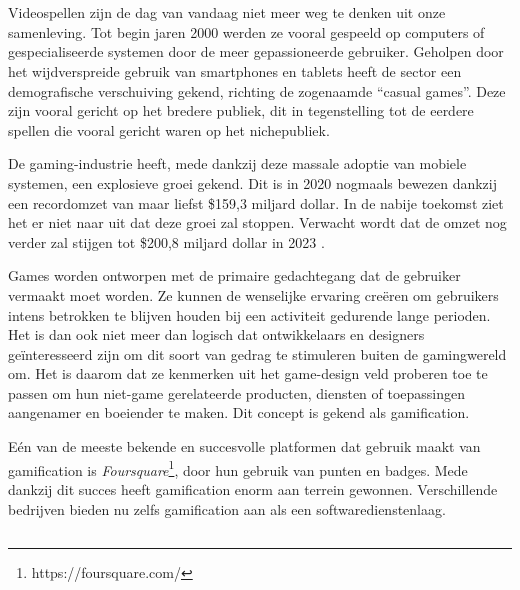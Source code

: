 
\chapter{}
\label{ch:inleiding}

Videospellen zijn de dag van vandaag niet meer weg te denken uit onze samenleving. Tot begin jaren 2000 werden ze vooral gespeeld op computers of gespecialiseerde systemen door de meer gepassioneerde gebruiker. Geholpen door het wijdverspreide gebruik van smartphones en tablets heeft de sector een demografische verschuiving gekend, richting de zogenaamde ``casual games''. Deze zijn vooral gericht op het bredere publiek, dit in tegenstelling tot de eerdere spellen die vooral gericht waren op het nichepubliek.

De gaming-industrie heeft, mede dankzij deze massale adoptie van mobiele systemen, een explosieve groei gekend. Dit is in 2020 nogmaals bewezen dankzij een recordomzet van maar liefst \$159,3 miljard dollar. In de nabije toekomst ziet het er niet naar uit dat deze groei zal stoppen. Verwacht wordt dat de omzet nog verder zal stijgen tot \$200,8 miljard dollar in 2023 \autocite{WePC2021}.

Games worden ontworpen met de primaire gedachtegang dat de gebruiker vermaakt moet worden. Ze kunnen de wenselijke ervaring creëren om gebruikers intens betrokken te blijven houden bij een activiteit gedurende lange perioden. Het is dan ook niet meer dan logisch dat ontwikkelaars en designers geïnteresseerd zijn om dit soort van gedrag te stimuleren buiten de gamingwereld om. Het is daarom dat ze kenmerken uit het game-design veld proberen toe te passen om hun niet-game gerelateerde producten, diensten of toepassingen aangenamer en boeiender te maken. Dit concept is gekend als gamification.

Eén van de meeste bekende en succesvolle platformen dat gebruik maakt van gamification is \textit{Foursquare}\footnote{https://foursquare.com/}, door hun gebruik van punten en badges. Mede dankzij dit succes heeft gamification enorm aan terrein gewonnen. Verschillende bedrijven bieden nu zelfs gamification aan als een softwaredienstenlaag.


\section{}
\label{sec:probleemstelling}


